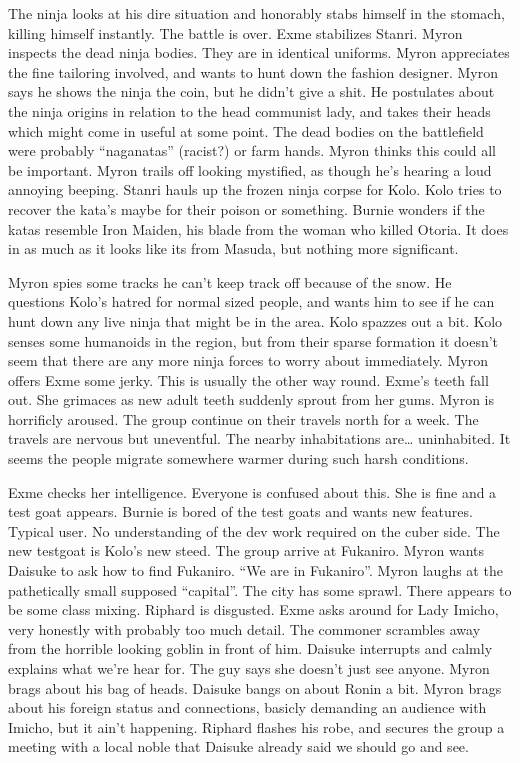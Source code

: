 The ninja looks at his dire situation and honorably stabs himself in the stomach, killing himself instantly. The battle is over. Exme stabilizes Stanri. Myron inspects the dead ninja bodies. They are in identical uniforms. Myron appreciates the fine tailoring involved, and wants to hunt down the fashion designer. Myron says he shows the ninja the coin, but he didn’t give a shit. He postulates about the ninja origins in relation to the head communist lady, and takes their heads which might come in useful at some point. The dead bodies on the battlefield were probably “naganatas” (racist?) or farm hands. Myron thinks this could all be important. Myron trails off looking mystified, as though he’s hearing a loud annoying beeping. Stanri hauls up the frozen ninja corpse for Kolo. Kolo tries to recover the kata’s maybe for their poison or something. Burnie wonders if the katas resemble Iron Maiden, his blade from the woman who killed Otoria. It does in as much as it looks like its from Masuda, but nothing more significant.\medskip

Myron spies some tracks he can't keep track off because of the snow. He questions Kolo’s hatred for normal sized people, and wants him to see if he can hunt down any live ninja that might be in the area. Kolo spazzes out a bit. Kolo senses some humanoids in the region, but from their sparse formation it doesn’t seem that there are any more ninja forces to worry about immediately. Myron offers Exme some jerky. This is usually the other way round. Exme’s teeth fall out. She grimaces as new adult teeth suddenly sprout from her gums. Myron is horrificly aroused. The group continue on their travels north for a week. The travels are nervous but uneventful. The nearby inhabitations are… uninhabited. It seems the people migrate somewhere warmer during such harsh conditions.\medskip

Exme checks her intelligence. Everyone is confused about this. She is fine and a test goat appears. Burnie is bored of the test goats and wants new features. Typical user. No understanding of the dev work required on the cuber side. The new testgoat is Kolo’s new steed. The group arrive at Fukaniro. Myron wants Daisuke to ask how to find Fukaniro. “We are in Fukaniro”. Myron laughs at the pathetically small supposed “capital”. The city has some sprawl. There appears to be some class mixing. Riphard is disgusted. Exme asks around for Lady Imicho, very honestly with probably too much detail. The commoner scrambles away from the horrible looking goblin in front of him. Daisuke interrupts and calmly explains what we’re hear for. The guy says she doesn’t just see anyone. Myron brags about his bag of heads. Daisuke bangs on about Ronin a bit. Myron brags about his foreign status and connections, basicly demanding an audience with Imicho, but it ain’t happening. Riphard flashes his robe, and secures the group a meeting with a local noble that Daisuke already said we should go and see.\medskip

